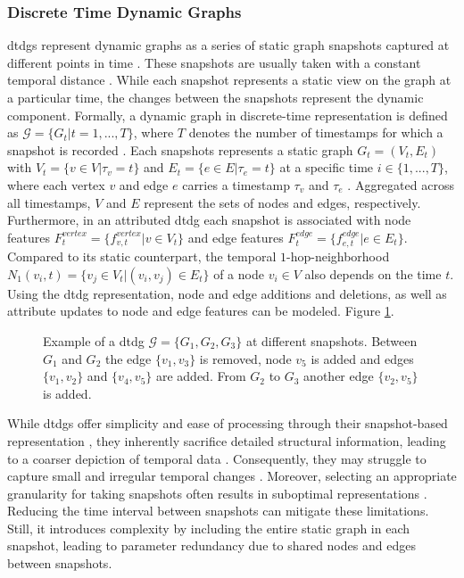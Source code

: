 \subsubsection{Discrete Time Dynamic Graphs}
\label{s_Background_Graphs_DTDGs}
\glspl{dtdg} represent dynamic graphs as a series of static graph snapshots captured at different points in time \cite{rossi_temporal_2020}. These snapshots are usually taken with a constant temporal distance \cite{souza_provably_2022}. While each snapshot represents a static view on the graph at a particular time, the changes between the snapshots represent the dynamic component. Formally, a dynamic graph in discrete-time representation is defined as $\mathcal{G} = \{G_t | t = 1,...,T\}$, where $T$ denotes the number of timestamps for which a snapshot is recorded \cite{you_roland_2022}. Each snapshots represents a static graph $G_t = (V_t, E_t)$ with $V_t = \{v \in V | \tau_v = t\}$ and $E_t = \{e \in E | \tau_e = t\}$ at a specific time $i \in \{1, ..., T\}$, where each vertex $v$ and edge $e$ carries a timestamp $\tau_v$ and $\tau_e$ \cite{you_roland_2022}. Aggregated across all timestamps, $V$ and $E$ represent the sets of nodes and edges, respectively. Furthermore, in an attributed \gls{dtdg} each snapshot is associated with node features $F_t^{vertex} = \{f_{v,t}^{vertex} | v \in V_t\}$ and edge features $F_t^{edge} = \{f_{e,t}^{edge} | e \in E_t\}$. Compared to its static counterpart, the temporal $1$-hop-neighborhood $N_1(v_i, t) = \{v_j \in V_t | (v_i, v_j) \in E_t\}$ of a node $v_i \in V$ also depends on the time $t$. Using the \gls{dtdg} representation, node and edge additions and deletions, as well as attribute updates to node and edge features can be modeled. Figure \ref{f_dtdg}.


\begin{figure}[h]
    
    \caption{Example of a \gls{dtdg} $\mathcal{G}=\{G_1, G_2, G_3\}$ at different snapshots. Between $G_1$ and $G_2$ the edge $\{v_1, v_3\}$ is removed, node $v_5$ is added and edges $\{v_1, v_2\}$ and $\{v_4, v_5\}$ are added. From $G_2$ to $G_3$ another edge $\{v_2, v_5\}$ is added.}
    \label{f_dtdg}
\end{figure}

While \glspl{dtdg} offer simplicity and ease of processing through their snapshot-based representation \cite{kazemi_representation_2019}, they inherently sacrifice detailed structural information, leading to a coarser depiction of temporal data \cite{trivedi_dyrep_2019, kazemi_representation_2019}. Consequently, they may struggle to capture small and irregular temporal changes \cite{trivedi_dyrep_2019, souza_provably_2022}. Moreover, selecting an appropriate granularity for taking snapshots often results in suboptimal representations \cite{trivedi_dyrep_2019}. Reducing the time interval between snapshots can mitigate these limitations. Still, it introduces complexity by including the entire static graph in each snapshot, leading to parameter redundancy due to shared nodes and edges between snapshots.

